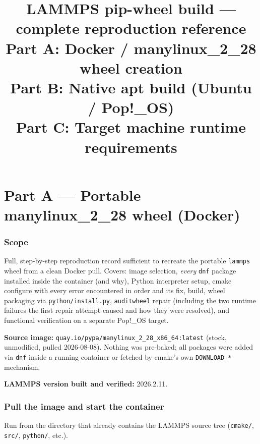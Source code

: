 \documentclass[11pt]{article}
\title{\textbf{LAMMPS pip-wheel build} --- complete reproduction reference\\[4pt]
\large\normalfont
\textbf{Part A:} Docker / manylinux\_2\_28 wheel creation\\
\textbf{Part B:} Native apt build (Ubuntu / Pop!\_OS)\\
\textbf{Part C:} Target machine runtime requirements}
\author{}
\date{}
\begin{document}
\maketitle
\tableofcontents
\newpage

\part{Part A --- Portable manylinux\_2\_28 wheel (Docker)}

\section*{Scope}

Full, step-by-step reproduction record sufficient to recreate the portable
\texttt{lammps} wheel from a clean Docker pull.  Covers: image selection,
\emph{every} \texttt{dnf} package installed inside the container (and why),
Python interpreter setup, cmake configure with every error encountered in order
and its fix, build, wheel packaging via \texttt{python/install.py},
\texttt{auditwheel} repair (including the two runtime failures the first repair
attempt caused and how they were resolved), and functional verification on a
separate Pop!\_OS target.

\textbf{Source image:} \texttt{quay.io/pypa/manylinux\_2\_28\_x86\_64:latest}
(stock, unmodified, pulled 2026-08-08).  Nothing was pre-baked; all packages
were added via \texttt{dnf} inside a running container or fetched by cmake's
own \texttt{DOWNLOAD\_*} mechanism.

\textbf{LAMMPS version built and verified:} 2026.2.11.

\section{Pull the image and start the container}
\label{sec:container}

Run from the directory that already contains the LAMMPS source tree
(\texttt{cmake/}, \texttt{src/}, \texttt{python/}, etc.).

\end{document}

